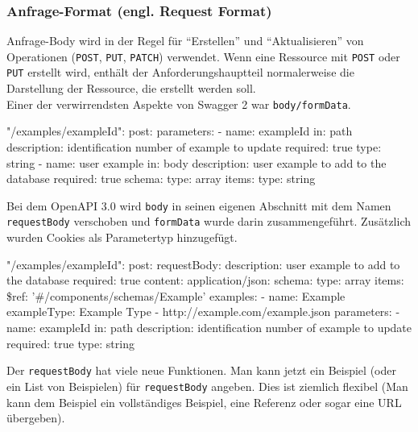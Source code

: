 \subsubsection{Anfrage-Format (engl. Request Format)}

Anfrage-Body wird in der Regel für "`Erstellen"' und "`Aktualisieren"' von Operationen (\texttt{POST}, \texttt{PUT}, \texttt{PATCH}) verwendet. Wenn eine Ressource mit \texttt{POST} oder \texttt{PUT} erstellt wird, enthält der Anforderungshauptteil normalerweise die Darstellung der Ressource, die erstellt werden soll\cite{openapirequestbody17}.\\

Einer der verwirrendsten Aspekte von Swagger 2 war \texttt{body/formData}.

\begin{LaTeXCode}[caption={Swagger 2.0 - Anfrage-Format},captionpos=b, label=LaTeXCode:openapi3.0-4][numbers=none]
"/examples/{exampleId}":
post:
parameters:
- name: exampleId
in: path
description: identification number of example to update
required: true
type: string
- name: user example
in: body
description: user example to add to the database
required: true
schema:
type: array
items:
type: string
\end{LaTeXCode}

Bei dem OpenAPI 3.0 wird \texttt{body} in seinen eigenen Abschnitt mit dem Namen \texttt{requestBody} verschoben und \texttt{formData} wurde darin zusammengeführt. Zusätzlich wurden Cookies als Parametertyp hinzugefügt.

\begin{LaTeXCode}[caption={Open API 3.0 - Anfrage-Format},captionpos=b, label=LaTeXCode:openapi3.0-5][numbers=none]
"/examples/{exampleId}":
post:
	requestBody:
		description: user example to add to the database
		required: true
		content:
			application/json: 
			 schema:
			  type: array
			  items:
			   \$ref: '#/components/schemas/Example'
			examples:
			 - name: Example
			   exampleType: Example Type
			 - http://example.com/example.json
	parameters:
	 - name: exampleId
	 in: path
	 description: identification number of example to update
	 required: true
	 type: string
\end{LaTeXCode}

Der \texttt{requestBody} hat viele neue Funktionen. Man kann jetzt ein Beispiel (oder ein List von Beispielen) für \texttt{requestBody} angeben. Dies ist ziemlich flexibel (Man kann dem Beispiel ein vollständiges Beispiel, eine Referenz oder sogar eine URL übergeben).

